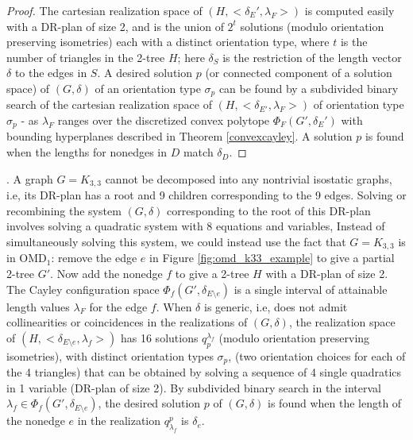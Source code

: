 \begin{proof}
    The cartesian realization
    space of $(H,<\delta_E', \lambda_F>)$ is
    computed easily with a DR-plan of size 2, and is the union of $2^t$
    solutions (modulo orientation preserving isometries) each with a distinct orientation type, where $t$ is the number of triangles in the 2-tree
    $H$;
    here $\delta_{S}$ is the restriction of the length vector $\delta$ to
    the edges in $S$.
    A desired solution $p$ (or connected component of a solution space)
    of $(G,\delta)$
    of an orientation type $\sigma_p$ can be found
    by a subdivided binary search   of the cartesian realization space of
    $(H, <\delta_{E'},\lambda_F>)$ of orientation type $\sigma_p$ -
    as $\lambda_F$ ranges over
    the discretized convex
    polytope $\Phi_F(G',\delta_E')$ with bounding hyperplanes described in
    Theorem \ref{convexcayley}.
    A solution $p$  is found  when the lengths for nonedges in $D$ match
    $\delta_D$.
\end{proof}



\medskip{}.
A graph $G=K_{3,3}$  cannot be decomposed into any nontrivial isostatic
graphs, i.e, its DR-plan has a root and 9
children corresponding to the 9 edges. Solving or recombining the system
$(G,\delta)$
corresponding to the root of
this DR-plan involves solving a quadratic system with 8 equations and variables,
Instead of simultaneously solving this system, we could instead use the fact
that $G=K_{3,3}$ is in OMD$_1$: remove the
edge $e$ in Figure \ref{fig:omd_k33_example} to give a partial 2-tree $G'$.
Now add the nonedge $f$ to give a 2-tree $H$ with a DR-plan of size 2.
The Cayley configuration space $\Phi_f(G', \delta_{E\setminus e})$
is a single interval of attainable length values $\lambda_F$ for
the edge $f$.
When $\delta$ is generic, i.e, does not admit collinearities or coincidences
in the realizations of $(G,\delta)$,
the realization space of $(H, <\delta_{E\setminus e}, \lambda_f>)$ has 16
solutions $q_p^{\lambda_f}$ (modulo orientation preserving isometries),
with distinct orientation types $\sigma_p$,
(two orientation choices for each of the 4 triangles)
that can be obtained by solving a sequence of 4 single quadratics in 1
variable (DR-plan of size 2).
By subdivided
binary search
in the interval $\lambda_f \in
\Phi_f(G', \delta_{E\setminus e})$, the desired
solution $p$  of $(G,\delta)$ is found when the length of the nonedge
$e$ in  the realization
$q^p_{\lambda_f}$
is $\delta_e$.
%
